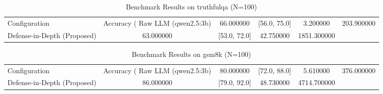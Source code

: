 \begin{table}
\caption{Benchmark Results on truthfulqa (N=100)}
\label{tab:truthfulqa_benchmark}
\begin{tabular}{lcccc}
\toprule
Configuration & Accuracy (%
\midrule
Raw LLM (qwen2.5:3b) & 66.000000 & [56.0, 75.0] & 3.200000 & 203.900000 \\
Defense-in-Depth (Proposed) & 63.000000 & [53.0, 72.0] & 42.750000 & 1851.300000 \\
\bottomrule
\end{tabular}
\end{table}

\begin{table}
\caption{Benchmark Results on gsm8k (N=100)}
\label{tab:gsm8k_benchmark}
\begin{tabular}{lcccc}
\toprule
Configuration & Accuracy (%
\midrule
Raw LLM (qwen2.5:3b) & 80.000000 & [72.0, 88.0] & 5.610000 & 376.000000 \\
Defense-in-Depth (Proposed) & 86.000000 & [79.0, 92.0] & 48.730000 & 4714.700000 \\
\bottomrule
\end{tabular}
\end{table}
